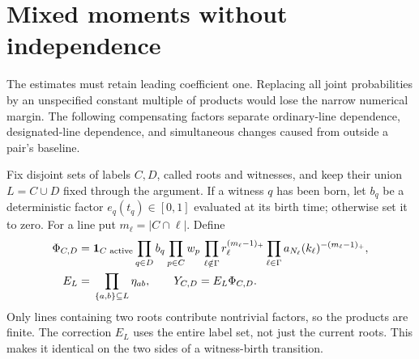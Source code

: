 \section{Mixed moments without independence}\label{sec:moments}

The estimates must retain leading coefficient one. Replacing all
joint probabilities by an unspecified constant multiple of products
would lose the narrow numerical margin. The following compensating
factors separate ordinary-line dependence, designated-line dependence,
and simultaneous changes caused from outside a pair's baseline.

Fix disjoint sets of labels \(C,D\), called roots and witnesses, and
keep their union \(L=C\cup D\) fixed through the argument. If a witness
\(q\) has been born, let \(b_q\) be a deterministic factor
\(e_q(t_q)\in[0,1]\) evaluated at its birth time; otherwise set it to
zero. For a line put \(m_\ell=|C\cap\ell|\). Define
\begin{align}
 \Phi_{C,D}={}&\mathbf 1_{C\text{ active}}
 \prod_{q\in D}b_q\prod_{p\in C}w_p\,
 \prod_{\ell\notin\Gamma}r_\ell^{(m_\ell-1)_+}
 \prod_{\ell\in\Gamma}a_{N_\ell}(k_\ell)^{-(m_\ell-1)_+},
 \label{eq:phi}\\
 E_L={}&\prod_{\{a,b\}\subseteq L}\eta_{ab},
 \qquad Y_{C,D}=E_L\Phi_{C,D}.\label{eq:etaall}
\end{align}
Only lines containing two roots contribute nontrivial factors, so the
products are finite. The correction \(E_L\) uses the entire label set,
not just the current roots. This makes it identical on the two sides
of a witness-birth transition.

